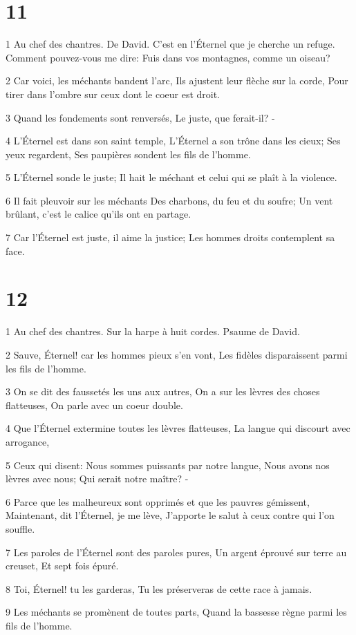 \chapter{11}

\par 1 Au chef des chantres. De David. C'est en l'Éternel que je cherche un refuge. Comment pouvez-vous me dire: Fuis dans vos montagnes, comme un oiseau?
\par 2 Car voici, les méchants bandent l'arc, Ils ajustent leur flèche sur la corde, Pour tirer dans l'ombre sur ceux dont le coeur est droit.
\par 3 Quand les fondements sont renversés, Le juste, que ferait-il? -
\par 4 L'Éternel est dans son saint temple, L'Éternel a son trône dans les cieux; Ses yeux regardent, Ses paupières sondent les fils de l'homme.
\par 5 L'Éternel sonde le juste; Il hait le méchant et celui qui se plaît à la violence.
\par 6 Il fait pleuvoir sur les méchants Des charbons, du feu et du soufre; Un vent brûlant, c'est le calice qu'ils ont en partage.
\par 7 Car l'Éternel est juste, il aime la justice; Les hommes droits contemplent sa face.

\chapter{12}

\par 1 Au chef des chantres. Sur la harpe à huit cordes. Psaume de David.
\par 2 Sauve, Éternel! car les hommes pieux s'en vont, Les fidèles disparaissent parmi les fils de l'homme.
\par 3 On se dit des faussetés les uns aux autres, On a sur les lèvres des choses flatteuses, On parle avec un coeur double.
\par 4 Que l'Éternel extermine toutes les lèvres flatteuses, La langue qui discourt avec arrogance,
\par 5 Ceux qui disent: Nous sommes puissants par notre langue, Nous avons nos lèvres avec nous; Qui serait notre maître? -
\par 6 Parce que les malheureux sont opprimés et que les pauvres gémissent, Maintenant, dit l'Éternel, je me lève, J'apporte le salut à ceux contre qui l'on souffle.
\par 7 Les paroles de l'Éternel sont des paroles pures, Un argent éprouvé sur terre au creuset, Et sept fois épuré.
\par 8 Toi, Éternel! tu les garderas, Tu les préserveras de cette race à jamais.
\par 9 Les méchants se promènent de toutes parts, Quand la bassesse règne parmi les fils de l'homme.

